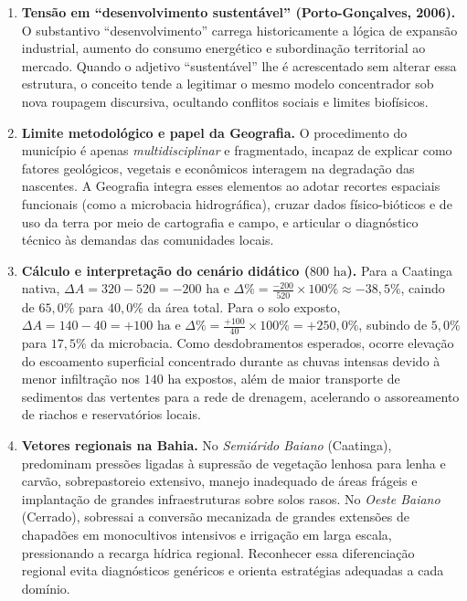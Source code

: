 \begin{boxGabarito}
\begin{enumerate}[leftmargin=1.8em, itemsep=4pt, start=6]
  \item \textbf{Tensão em ``desenvolvimento sustentável'' (Porto-Gonçalves, 2006).} O substantivo ``desenvolvimento'' carrega historicamente a lógica de expansão industrial, aumento do consumo energético e subordinação territorial ao mercado. Quando o adjetivo ``sustentável'' lhe é acrescentado sem alterar essa estrutura, o conceito tende a legitimar o mesmo modelo concentrador sob nova roupagem discursiva, ocultando conflitos sociais e limites biofísicos.

  \item \textbf{Limite metodológico e papel da Geografia.} O procedimento do município é apenas \emph{multidisciplinar} e fragmentado, incapaz de explicar como fatores geológicos, vegetais e econômicos interagem na degradação das nascentes. A Geografia integra esses elementos ao adotar recortes espaciais funcionais (como a microbacia hidrográfica), cruzar dados físico-bióticos e de uso da terra por meio de cartografia e campo, e articular o diagnóstico técnico às demandas das comunidades locais.

  \item \textbf{Cálculo e interpretação do cenário didático ($800\text{ ha}$).}
  Para a Caatinga nativa, $\Delta A = 320 - 520 = -200\text{ ha}$ e $\Delta\% = \frac{-200}{520} \times 100\% \approx -38{,}5\%$, caindo de $65{,}0\%$ para $40{,}0\%$ da área total. Para o solo exposto, $\Delta A = 140 - 40 = +100\text{ ha}$ e $\Delta\% = \frac{+100}{40} \times 100\% = +250{,}0\%$, subindo de $5{,}0\%$ para $17{,}5\%$ da microbacia. Como desdobramentos esperados, ocorre elevação do escoamento superficial concentrado durante as chuvas intensas devido à menor infiltração nos $140\text{ ha}$ expostos, além de maior transporte de sedimentos das vertentes para a rede de drenagem, acelerando o assoreamento de riachos e reservatórios locais.

  \item \textbf{Vetores regionais na Bahia.} No \emph{Semiárido Baiano} (Caatinga), predominam pressões ligadas à supressão de vegetação lenhosa para lenha e carvão, sobrepastoreio extensivo, manejo inadequado de áreas frágeis e implantação de grandes infraestruturas sobre solos rasos. No \emph{Oeste Baiano} (Cerrado), sobressai a conversão mecanizada de grandes extensões de chapadões em monocultivos intensivos e irrigação em larga escala, pressionando a recarga hídrica regional. Reconhecer essa diferenciação regional evita diagnósticos genéricos e orienta estratégias adequadas a cada domínio.


\end{enumerate}
\end{boxGabarito}
